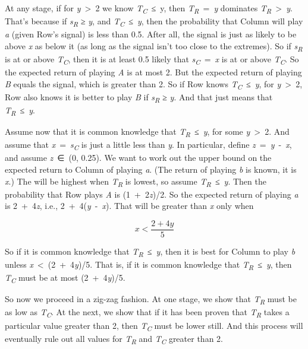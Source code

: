 \documentclass[
  11pt,
]{book}
\begin{document}
At any stage, if for \emph{y}~\textgreater~2 we know \emph{T\textsubscript{C}}~≤~y, then \emph{T\textsubscript{R}}~=~\emph{y} dominates \emph{T\textsubscript{R}}~\textgreater~\emph{y}. That's because if \emph{s\textsubscript{R}} ≥ \emph{y}, and \emph{T\textsubscript{C}}~≤~\emph{y}, then the probability that Column will play \emph{a} (given Row's signal) is less than 0.5. After all, the signal is just as likely to be above \emph{x} as below it (as long as the signal isn't too close to the extremes). So if \emph{s\textsubscript{R}} is at or above \emph{T\textsubscript{C}}, then it is at least 0.5 likely that \emph{s\textsubscript{C}}~=~\emph{x} is at or above \emph{T\textsubscript{C}}. So the expected return of playing \emph{A} is at most 2. But the expected return of playing \emph{B} equals the signal, which is greater than 2. So if Row knows \emph{T\textsubscript{C}}~≤~\emph{y}, for \emph{y}~\textgreater~2, Row also knows it is better to play \emph{B} if \emph{s\textsubscript{R}} ≥ \emph{y}. And that just means that \emph{T\textsubscript{R}}~≤~\emph{y}.

Assume now that it is common knowledge that \emph{T\textsubscript{R}}~≤~\emph{y}, for some \emph{y}~\textgreater~2. And assume that \emph{x}~=~\emph{s\textsubscript{C}} is just a little less than \emph{y}. In particular, define \emph{z}~=~\emph{y}~-~\emph{x}, and assume \emph{z}~∈~(0, 0.25). We want to work out the upper bound on the expected return to Column of playing \emph{a}. (The return of playing \emph{b} is known, it is \emph{x}.) The will be highest when \emph{T\textsubscript{R}} is lowest, so assume \emph{T\textsubscript{R}}~≤~\emph{y}. Then the probability that Row plays \emph{A} is (1~+~2\emph{z})/2. So the expected return of playing \emph{a} is 2~+~4\emph{z}, i.e., 2~+~4(\emph{y}~-~\emph{x}). That will be greater than \emph{x} only when

\[x < \frac{2 + 4y}{5}\]

So if it is common knowledge that \emph{T\textsubscript{R}}~≤~\emph{y}, then it is best for Column to play \emph{b} unless \emph{x}~\textless~(2~+~4\emph{y})/5. That is, if it is common knowledge that \emph{T\textsubscript{R}}~≤~\emph{y}, then \emph{T\textsubscript{C}} must be at most (2~+~4\emph{y})/5.

So now we proceed in a zig-zag fashion. At one stage, we show that \emph{T\textsubscript{R}} must be as low as \emph{T\textsubscript{C}}. At the next, we show that if it has been proven that \emph{T\textsubscript{R}} takes a particular value greater than 2, then \emph{T\textsubscript{C}} must be lower still. And this process will eventually rule out all values for \emph{T\textsubscript{R}} and \emph{T\textsubscript{C}} greater than 2.
\end{document}
